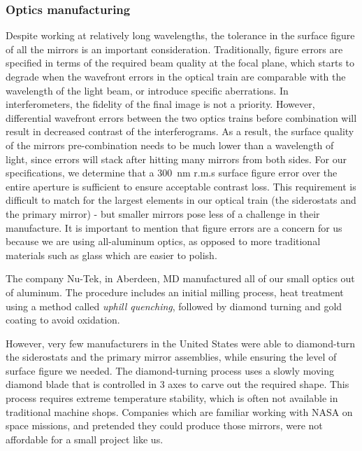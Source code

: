 \subsubsection{Optics manufacturing}

Despite working at relatively long wavelengths, the tolerance in the surface figure of all the mirrors is an important consideration. Traditionally, figure errors are specified in terms of the required beam quality at the focal plane, which starts to degrade when the wavefront errors in the optical train are comparable with the wavelength of the light beam, or introduce specific aberrations. In interferometers, the fidelity of the final image is not a priority. However, differential wavefront errors between the two optics trains before combination will result in decreased contrast of the interferograms. As a result, the surface quality of the mirrors pre-combination needs to be much lower than a wavelength of light, since errors will stack after hitting many mirrors from both sides. For our specifications, we determine that a \SI{300}{\nano\meter} r.m.s surface figure error over the entire aperture is sufficient to ensure acceptable contrast loss. This requirement is difficult to match for the largest elements in our optical train (the siderostats and the primary mirror) - but smaller mirrors pose less of a challenge in their manufacture. It is important to mention that figure errors are a concern for us because we are using all-aluminum optics, as opposed to more traditional materials such as glass which are easier to polish.



The company Nu-Tek, in Aberdeen, MD manufactured all of our small optics out of aluminum. The procedure includes an initial milling process, heat treatment using a method called \textit{uphill quenching}, followed by diamond turning and gold coating to avoid oxidation.

However, very few manufacturers in the United States were able to diamond-turn the siderostats and the primary mirror assemblies, while ensuring the level of surface figure we needed. The diamond-turning process uses a slowly moving diamond blade that is controlled in 3 axes to carve out the required shape. This process requires extreme temperature stability, which is often not available in traditional machine shops. Companies which are familiar working with NASA on space missions, and pretended they could produce those mirrors, were not affordable for a small project like us.

